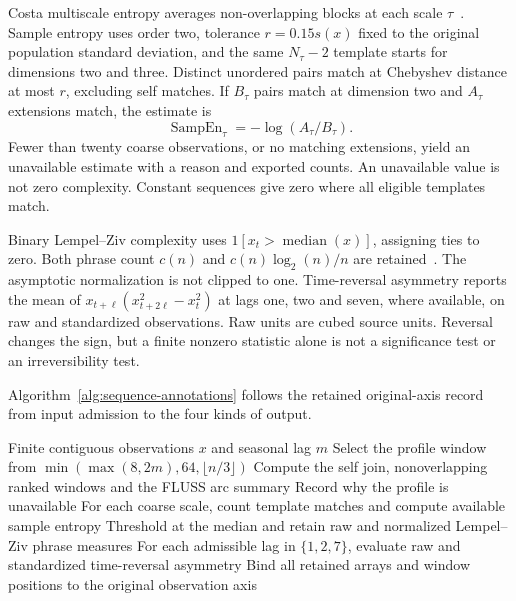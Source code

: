 \documentclass[11pt,a4paper]{article}
\begin{document}
Costa multiscale entropy averages non-overlapping blocks at each scale $\tau$~\cite{costa}. Sample entropy uses order two, tolerance $r=0.15s(x)$ fixed to the original population standard deviation, and the same $N_\tau-2$ template starts for dimensions two and three. Distinct unordered pairs match at Chebyshev distance at most $r$, excluding self matches. If $B_\tau$ pairs match at dimension two and $A_\tau$ extensions match, the estimate is
\begin{equation}
 \operatorname{SampEn}_\tau=-\log(A_\tau/B_\tau).
\end{equation}
Fewer than twenty coarse observations, or no matching extensions, yield an unavailable estimate with a reason and exported counts. An unavailable value is not zero complexity. Constant sequences give zero where all eligible templates match.

Binary Lempel--Ziv complexity uses $1[x_t>\operatorname{median}(x)]$, assigning ties to zero. Both phrase count $c(n)$ and $c(n)\log_2(n)/n$ are retained~\cite{lz}. The asymptotic normalization is not clipped to one. Time-reversal asymmetry reports the mean of $x_{t+\ell}(x_{t+2\ell}^2-x_t^2)$ at lags one, two and seven, where available, on raw and standardized observations. Raw units are cubed source units. Reversal changes the sign, but a finite nonzero statistic alone is not a significance test or an irreversibility test.

Algorithm~\ref{alg:sequence-annotations} follows the retained original-axis
record from input admission to the four kinds of output.
\begin{algorithm}[htbp]
\caption{Compute original-axis sequence annotations and complexity measures from an admitted contiguous observation record.}
\label{alg:sequence-annotations}
\begin{algorithmic}[1]
\Require Finite contiguous observations $x$ and seasonal lag $m$
\State Select the profile window from $\min(\max(8,2m),64,\lfloor n/3\rfloor)$
  \State Compute the self join, nonoverlapping ranked windows and the FLUSS arc summary
\Else
  \State Record why the profile is unavailable
\EndIf
\State For each coarse scale, count template matches and compute available sample entropy
\State Threshold at the median and retain raw and normalized Lempel--Ziv phrase measures
\State For each admissible lag in $\{1,2,7\}$, evaluate raw and standardized time-reversal asymmetry
\State Bind all retained arrays and window positions to the original observation axis
\end{algorithmic}
\end{algorithm}
\end{document}
